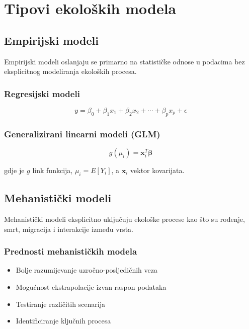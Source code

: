 \documentclass[12pt,a4paper,twoside]{book}
\begin{document}
	\chapter{Tipovi ekoloških modela}
	
	\section{Empirijski modeli}
	
	Empirijski modeli oslanjaju se primarno na statističke odnose u podacima bez eksplicitnog modeliranja ekoloških procesa.
	
	\subsection{Regresijski modeli}
	\begin{equation}
		y = \beta_0 + \beta_1 x_1 + \beta_2 x_2 + \cdots + \beta_p x_p + \epsilon
	\end{equation}
	
	\subsection{Generalizirani linearni modeli (GLM)}
	\begin{equation}
		g(\mu_i) = \mathbf{x}_i^T \boldsymbol{\beta}
	\end{equation}
	
	gdje je $g$ link funkcija, $\mu_i = E[Y_i]$, a $\mathbf{x}_i$ vektor kovarijata.
	
	\section{Mehanistički modeli}
	
	Mehanistički modeli eksplicitno uključuju ekološke procese kao što su rođenje, smrt, migracija i interakcije između vrsta.
	
	\subsection{Prednosti mehanističkih modela}
	\begin{itemize}
		\item Bolje razumijevanje uzročno-posljedičnih veza
		\item Mogućnost ekstrapolacije izvan raspon podataka
		\item Testiranje različitih scenarija
		\item Identificiranje ključnih procesa
	\end{itemize}
	
\end{document}
